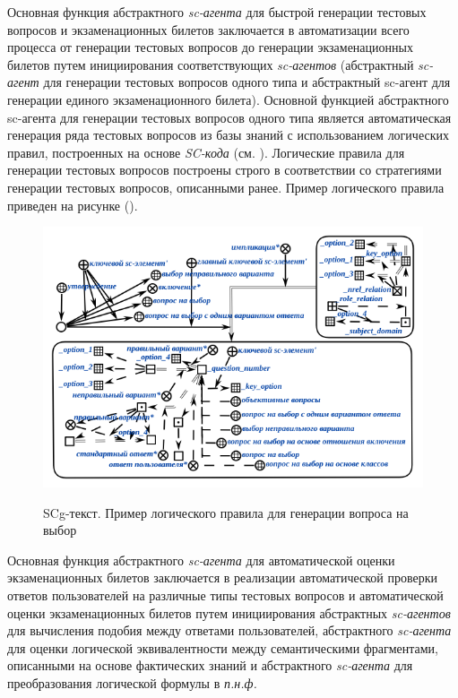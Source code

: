 Основная функция абстрактного \textit{sc-агента} для быстрой генерации тестовых вопросов и экзаменационных билетов заключается в автоматизации всего процесса от генерации тестовых вопросов до генерации экзаменационных билетов путем инициирования соответствующих \textit{sc-агентов} (абстрактный \textit{sc-агент} для генерации тестовых вопросов одного типа и абстрактный sc-агент для генерации единого экзаменационного билета). Основной функцией абстрактного sc-агента для генерации тестовых вопросов одного типа является автоматическая генерация ряда тестовых вопросов из базы знаний с использованием логических правил, построенных на основе \textit{SC-кода} (см. ). Логические правила для генерации тестовых вопросов построены строго в соответствии со стратегиями генерации тестовых вопросов, описанными ранее. Пример логического правила приведен на рисунке (\textit{}).

\begin{figure}[H]
	\caption{SCg-текст. Пример логического правила для генерации вопроса на выбор}
	\includegraphics[scale=1]{author/part7/figures/logic_rule_example.png}
	\label{fig:LRE_example}
\end{figure}

Основная функция абстрактного \textit{sc-агента} для автоматической оценки экзаменационных билетов заключается в реализации автоматической проверки ответов пользователей на различные типы тестовых вопросов и автоматической оценки экзаменационных билетов путем инициирования абстрактных \textit{sc-агентов} для вычисления подобия между ответами пользователей, абстрактного \textit{sc-агента} для оценки логической эквивалентности между семантическими фрагментами, описанными на основе фактических знаний и абстрактного \textit{sc-агента} для преобразования логической формулы в \textit{п.н.ф.}
